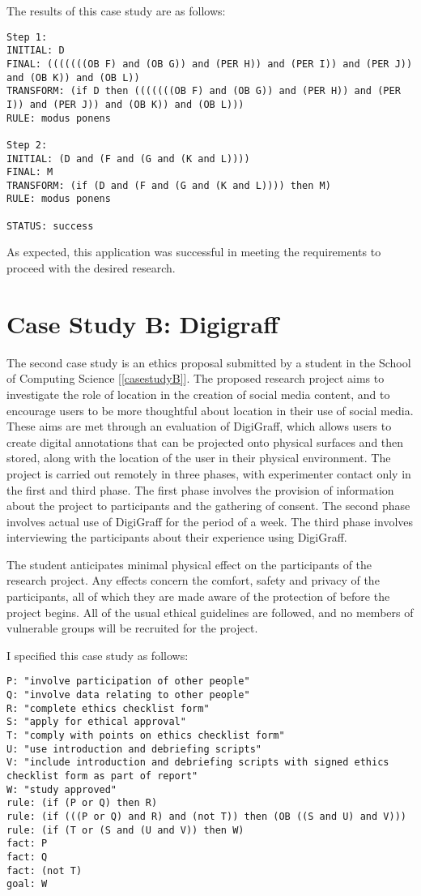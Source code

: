 \documentclass{l4proj}
\begin{document}
The results of this case study are as follows: 
\begin{verbatim}
Step 1: 
INITIAL: D
FINAL: (((((((OB F) and (OB G)) and (PER H)) and (PER I)) and (PER J)) and (OB K)) and (OB L))
TRANSFORM: (if D then (((((((OB F) and (OB G)) and (PER H)) and (PER I)) and (PER J)) and (OB K)) and (OB L)))
RULE: modus ponens

Step 2: 
INITIAL: (D and (F and (G and (K and L))))
FINAL: M
TRANSFORM: (if (D and (F and (G and (K and L)))) then M)
RULE: modus ponens

STATUS: success
\end{verbatim}

As expected, this application was successful in meeting the requirements to proceed with the desired research. 

\section{Case Study B: Digigraff}
The second case study is an ethics proposal submitted by a student in the School of Computing Science [\ref{casestudyB}]. The proposed research project aims to investigate the role of location in the creation of social media content, and to encourage users to be more thoughtful about location in their use of social media. These aims are met through an evaluation of DigiGraff, which allows users to create digital annotations that can be projected onto physical surfaces and then stored, along with the location of the user in their physical environment. The project is carried out remotely in three phases, with experimenter contact only in the first and third phase. The first phase involves the provision of information about the project to participants and the gathering of consent. The second phase involves actual use of DigiGraff for the period of a week. The third phase involves interviewing the participants about their experience using DigiGraff. 

The student anticipates minimal physical effect on the participants of the research project. Any effects concern the comfort, safety and privacy of the participants, all of which they are made aware of the protection of before the project begins. All of the usual ethical guidelines are followed, and no members of vulnerable groups will be recruited for the project. 

I specified this case study as follows: 
\begin{verbatim}
P: "involve participation of other people"
Q: "involve data relating to other people"
R: "complete ethics checklist form"
S: "apply for ethical approval"
T: "comply with points on ethics checklist form"
U: "use introduction and debriefing scripts"
V: "include introduction and debriefing scripts with signed ethics checklist form as part of report"
W: "study approved"
rule: (if (P or Q) then R)
rule: (if (((P or Q) and R) and (not T)) then (OB ((S and U) and V)))
rule: (if (T or (S and (U and V)) then W)
fact: P
fact: Q
fact: (not T)
goal: W
\end{verbatim}
\end{document}
